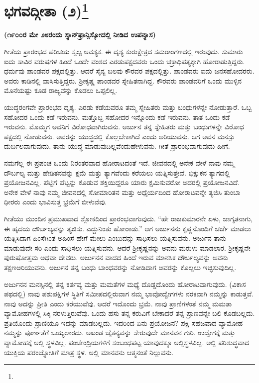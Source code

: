 
\chapter{ಭಗವದ್ಗೀತಾ (೨)\protect\footnote{\engfoot{}}}

\centerline{\textbf{(೧೯೦೦ರ ಮೇ ೨೮ರಂದು ಸ್ಯಾನ್​ಫ್ರಾನ್ಸಿಸ್ಕೋದಲ್ಲಿ ನೀಡಿದ ಉಪನ್ಯಾಸ)}}

ಗೀತೆಯ ಪ್ರಾರಂಭದ ಪರಿಚಯ ಸ್ವಲ್ಪ ಅವಶ್ಯಕ. ಈ ದೃಶ್ಯ ಕುರುಕ್ಷೇತ್ರದ ಸಮರಾಂಗಣದಲ್ಲಿ ಇರುವುದು. ಸುಮಾರು ಐದು ಸಾವಿರ ವರುಷಗಳ ಹಿಂದೆ ಒಂದೇ ವಂಶದ ಎರಡು\break ಪಕ್ಷದವರು ಒಂದು ಚಕ್ರಾಧಿಪತ್ಯಕ್ಕಾಗಿ ಹೋರಾಡುತ್ತಿದ್ದರು. ಧರ್ಮವು ಪಾಂಡ\-ವರ ಪಕ್ಷದಲ್ಲಿತ್ತು. ಆದರೆ ಸೈನ್ಯ ಬಲವು ಕೌರವರ ಪಕ್ಷದಲ್ಲಿತ್ತು. ಪಾಂಡವರು ಐದು ಜನ\break ಸಹೋದರರು. ಅವರು ಕಾಡಿನಲ್ಲಿ ವಾಸಿಸುತ್ತಿದ್ದರು. ಶ‍್ರೀಕೃಷ್ಣ ಪಾಂಡವರ ಸ್ನೇಹಿತನಾಗಿದ್ದ. ಕೌರವರು ಪಾಂಡವರಿಗೆ ಒಂದು ಮುಳ್ಳಿನ ಮೊನೆಯಷ್ಟು ಕೂಡ ರಾಜ್ಯವನ್ನು ಕೊಡಲು ಒಪ್ಪಲಿಲ್ಲ.

ಯುದ್ಧರಂಗವೇ ಪ್ರಾರಂಭದ ದೃಶ್ಯ. ಎರಡು ಕಡೆಯವರೂ ತಮ್ಮ ಸ್ನೇಹಿತರು ಮತ್ತು ಬಂಧುಗಳನ್ನೇ ನೋಡುತ್ತಾರೆ. ಒಬ್ಬ ಸಹೋದರ ಒಂದು ಕಡೆ ಇರುವನು. ಮತ್ತೊಬ್ಬ ಸಹೋದರ ಇನ್ನೊಂದು ಕಡೆ ಇರುವನು. ತಾತ ಒಂದು ಕಡೆ ಇರುವನು. ಮೊಮ್ಮಗ ಅವನಿಗೆ ವಿರೋಧವಾಗಿರುವನು. ಅರ್ಜುನ ತನ್ನ ಸ್ನೇಹಿತರು ಮತ್ತು ಬಂಧುಗಳನ್ನೇ ವಿರೋಧ ಪಕ್ಷದಲ್ಲಿ ನೋಡುವನು. ಅವರನ್ನು ಯುದ್ಧದಲ್ಲಿ ಕೊಲ್ಲಬೇಕಾಗಿದೆ ಎಂದು ಅರಿಯುವನು. ಆಗ ಅವನ ಮನಸ್ಸು ದುರ್ಬಲವಾಗುವುದು. ತಾನು ಯುದ್ಧ ಮಾಡುವುದಿಲ್ಲವೆಂದು\break ಹೇಳುವನು. ಗೀತೆ ಪ್ರಾರಂಭವಾಗುವುದು ಹೀಗೆ.

ನಮಗೆಲ್ಲ ಈ ಪ್ರಪಂಚ ಒಂದು ನಿರಂತರವಾದ ಹೋರಾಟದಂತೆ ಇದೆ. ಜೀವನದಲ್ಲಿ ಅನೇಕ ವೇಳೆ ನಾವು ನಮ್ಮ ದೌರ್ಬಲ್ಯ ಮತ್ತು ಹೇಡಿತನವನ್ನು ಕ್ಷಮೆ ಮತ್ತು ತ್ಯಾಗವೆಂದು ಕರೆಯಲು ಯತ್ನಿಸುತ್ತೇವೆ. ಭಿಕ್ಷುಕನ ತ್ಯಾಗದಲ್ಲಿ ಪ್ರಯೋಜನವಿಲ್ಲ. ಪೆಟ್ಟಿಗೆ ಪೆಟ್ಟನ್ನು ಕೊಡುವ ಶಕ್ತಿಯಿದ್ದರೂ ಯಾರು ಕ್ಷಮಿಸುವರೋ ಅದರಲ್ಲಿ ಪ್ರಯೋಜನವಿದೆ. ಅನೇಕ ವೇಳೆ ನಾವು ನಮ್ಮ ಜೀವನದಲ್ಲಿ ಸೋಮಾರಿತನ ಮತ್ತು ಅಧೈರ್ಯದಿಂದ ಹೋರಾಟವನ್ನೇ ತ್ಯಜಿಸಿ ತುಂಬಾ ಧೀರರು ಎಂದು ಭಾವಿಸುತ್ತ ಭ್ರಮೆಗೆ ಬೀಳುವೆವು.

ಗೀತೆಯು ಮುಂದಿನ ಪ್ರಮುಖವಾದ ಶ್ಲೋಕದಿಂದ ಪ್ರಾರಂಭವಾಗುವುದು. “ಹೇ ರಾಜಕುಮಾರನೇ ಏಳು, ಜಾಗೃತನಾಗು, ಈ ಹೃದಯ ದೌರ್ಬಲ್ಯವನ್ನು ತ್ಯಜಿಸು. ಎದ್ದುನಿಂತು ಹೋರಾಡು.” ಆಗ ಅರ್ಜುನನು ಕೃಷ್ಣನೊಂದಿಗೆ ಚರ್ಚೆ ಮಾಡಲು ಯತ್ನಿಸಿದಾಗ ಹಿಂಸೆಗಿಂತ ಅಹಿಂಸೆ ಹೇಗೆ ಮೇಲು ಎಂಬುದನ್ನು ಸಾಧಿಸಲು ಯತ್ನಿಸುವನು. ಅರ್ಜುನ ತಾನು ಮಾಡುವುದೇ ಸರಿ ಎಂದು ಸಾಧಿಸಲು ಯತ್ನಿಸುವನು. ಆದರೆ ಶ‍್ರೀಕೃಷ್ಣನನ್ನು ಅವನು ಮರುಳು ಮಾಡಲಾರ. ಶ‍್ರೀಕೃಷ್ಣನೇ ಪುರುಷೋತ್ತಮ ಅಥವಾ ದೇವರು. ಅರ್ಜುನನ ವಾದದ ಹಿಂದೆ ಇರುವ ಮಾನಸಿಕ ದೌರ್ಬಲ್ಯವನ್ನು ಅವನು ತಕ್ಷಣ\break ಅರಿಯುವನು. ಅರ್ಜುನ ತನ್ನ ಬಂಧು ಬಾಂಧವರನ್ನು ನೋಡಿದಾಗ ಅವರನ್ನು ಕೊಲ್ಲಲು ಇಚ್ಛಿಸುವುದಿಲ್ಲ.

ಅರ್ಜುನನ ಮನಸ್ಸಿನಲ್ಲಿ ತನ್ನ ಕರ್ತವ್ಯ ಮತ್ತು ಮಮತೆಗಳ ಮಧ್ಯೆ ದೊಡ್ಡದೊಂದು ಹೋರಾಟವಾಗುವುದು. (ವಿಕಾಸ ಪಥದಲ್ಲಿ) ನಾವು ಪಶುಪಕ್ಷಿಗಳ ಸ್ಥಿತಿಗೆ ಸಮೀಪದಲ್ಲಿರುವಾಗ ನಮ್ಮ ಭಾವೋದ್ವೇಗಗಳು ನರಕವಾಗಿ ನಮ್ಮನ್ನು ಕಾಡುತ್ತವೆ. ನಾವು ಅದನ್ನು ಪ್ರೀತಿ ಎಂದು ಕರೆಯುವೆವು. ಆದರೆ ಇದೊಂದು ಭ್ರಮೆ. ನಾವು ಪ್ರಾಣಿಗಳಂತೆ ನಮ್ಮ ಮಮತಾ ವ್ಯಾಮೋಹಗಳಲ್ಲಿ ಸಿಕ್ಕಿ ನರಳುತ್ತಿರುವೆವು. ಒಂದು ಹಸು ತನ್ನ ಕರುವಿಗೆ ಬೇಕಾದರೆ ತನ್ನ ಪ್ರಾಣವನ್ನೇ ಬಲಿ ಕೊಡಬಲ್ಲದು. ಪ್ರತಿಯೊಂದು ಪ್ರಾಣಿಯೂ ಇದನ್ನು ಮಾಡಬಲ್ಲದು. ಇದರಿಂದ ಏನು ಪ್ರಯೋಜನ? ಪಕ್ಷಿ ಸಹಜವಾದ ವ್ಯಾಮೋಹ ನಮ್ಮನ್ನು ಪೂರ್ಣತೆಗೆ ಒಯ್ಯಲಾರದು. ಅಖಂಡ ಚೈತನ್ಯವನ್ನು ಸೇರುವುದೇ ಮಾನವನ ಗುರಿ. ಉದ್ವೇಗಕ್ಕೆ ಮತ್ತು ವ್ಯಾಮೋಹಕ್ಕೆ ಅಲ್ಲಿ ಸ್ಥಳವಿಲ್ಲ. ಪಂಚೇಂದ್ರಿಯಗಳಿಗೆ ಸಂಬಂಧಪಟ್ಟ ಯಾವುದಕ್ಕೂ ಅಲ್ಲಿ\break ಸ್ಥಳವಿಲ್ಲ. ಅಲ್ಲಿ ಪರಿಶುದ್ಧವಾದ ಯುಕ್ತಿಯ ಪರಂಜ್ಯೋತಿಗೆ ಮಾತ್ರ ಸ್ಥಳ. ಅಲ್ಲಿ ಮಾನವನು ಆತ್ಮನಂತೆ ನಿಲ್ಲುವನು.

